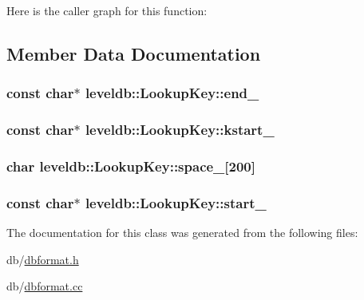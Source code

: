 Here is the caller graph for this function\-:




\subsection{Member Data Documentation}
\hypertarget{classleveldb_1_1_lookup_key_aff523de430eb2a286884612b19eb8023}{
\subsubsection[{end\-\_\-}]{\setlength{\rightskip}{0pt plus 5cm}const char$\ast$ leveldb\-::\-Lookup\-Key\-::end\-\_\-\hspace{0.3cm}{\ttfamily [private]}}}\label{classleveldb_1_1_lookup_key_aff523de430eb2a286884612b19eb8023}
\hypertarget{classleveldb_1_1_lookup_key_a7568f0423d181c4164400acccfafd710}{
\subsubsection[{kstart\-\_\-}]{\setlength{\rightskip}{0pt plus 5cm}const char$\ast$ leveldb\-::\-Lookup\-Key\-::kstart\-\_\-\hspace{0.3cm}{\ttfamily [private]}}}\label{classleveldb_1_1_lookup_key_a7568f0423d181c4164400acccfafd710}
\hypertarget{classleveldb_1_1_lookup_key_a96b495591054b9b7d8fbc1c393c97ac9}{
\subsubsection[{space\-\_\-}]{\setlength{\rightskip}{0pt plus 5cm}char leveldb\-::\-Lookup\-Key\-::space\-\_\-\mbox{[}200\mbox{]}\hspace{0.3cm}{\ttfamily [private]}}}\label{classleveldb_1_1_lookup_key_a96b495591054b9b7d8fbc1c393c97ac9}
\hypertarget{classleveldb_1_1_lookup_key_aa03e702970f32dd5629838cbac3b9ded}{
\subsubsection[{start\-\_\-}]{\setlength{\rightskip}{0pt plus 5cm}const char$\ast$ leveldb\-::\-Lookup\-Key\-::start\-\_\-\hspace{0.3cm}{\ttfamily [private]}}}\label{classleveldb_1_1_lookup_key_aa03e702970f32dd5629838cbac3b9ded}


The documentation for this class was generated from the following files\-:\begin{DoxyCompactItemize}
\item 
db/\hyperlink{dbformat_8h}{dbformat.\-h}\item 
db/\hyperlink{dbformat_8cc}{dbformat.\-cc}\end{DoxyCompactItemize}
